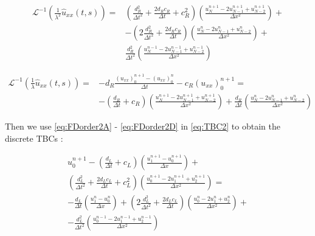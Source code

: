 \begin{equation}
     \label{eq:FDorder2C}
         \begin{aligned}
    \mathcal{L}^{-1} \left( \frac{1}{\lambda^2} \hat{u}_{xx}(t,s) \right) = & \left( \frac{d_R^2}{\Delta t^2} + \frac{2d_Rc_R}{\Delta t} + c_R^2  \right) \left(  \frac{u_{N}^{n+1} - 2u_{N-1}^{n+1} + u_{N-2}^{n+1}}{\Delta x^2} \right) + \\
    			& - \left( 2\frac{d_R^2}{\Delta t^2} + \frac{2d_Rc_R}{\Delta t}\right) \left(  \frac{u_N^{n} - 2u_{N-1}^n + u_{N-2}^{n}}{\Delta x^2} \right) + \\
    			& \frac{d_R^2}{\Delta t^2} \left(  \frac{u_N^{n-1} - 2u_{N-1}^{n-1} + u_{N-2}^{n-1}}{\Delta x^2} \right)
    \end{aligned}
 \end{equation}
     			
\begin{equation}
     \label{eq:FDorder2D}
         \begin{aligned}
    \mathcal{L}^{-1} \left( \frac{1}{\lambda} \hat{u}_{xx}(t,s) \right) = & -d_R \frac{ (u_{xx})_0^{n+1} - (u_{xx})_0^n}{\Delta t} - c_R (u_{xx})_0^{n+1} =\\
    			& -\left( \frac{d_R}{\Delta t} + c_R \right) \left( \frac{u_N^{n+1} -2 u_{N-1}^{n+1} + u_{N-2}^{n+1}}{\Delta x^2}\right) + \frac{d_R}{\Delta t}\left( \frac{u_{N}^{n} - 2u_{N-1}^{n} + u_{N-2}^n}{\Delta x^2}\right)
    \end{aligned}
\end{equation}

\indent Then we use \eqref{eq:FDorder2A} - \eqref{eq:FDorder2D} in \eqref{eq:TBC2} to obtain the discrete TBCs :

\begin{equation}
	\begin{aligned}
    u_0^{n+1} - \left( \frac{d_L}{\Delta t} + c_L \right) \left( \frac{u_1^{n+1} - u_0^{n+1}}{\Delta x}\right) + \\
     \left( \frac{d_L^2}{\Delta t^2} + \frac{2d_Lc_L}{\Delta t} + c_L^2  \right) \left(  \frac{u_0^{n+1} - 2u_1^{n+1} + u_2^{n+1}}{\Delta x^2} \right) = \\
     -\frac{d_L}{\Delta t}\left( \frac{u_1^{n} - u_0^{n}}{\Delta x}\right) +  \left( 2\frac{d_L^2}{\Delta t^2} + \frac{2d_Lc_L}{\Delta t}\right) \left(  \frac{u_0^{n} - 2u_1^n + u_2^{n}}{\Delta x^2} \right) + \\
     -  \frac{d_L^2}{\Delta t^2} \left(  \frac{u_0^{n-1} - 2u_1^{n-1} + u_2^{n-1}}{\Delta x^2} \right)
   \end{aligned}
\end{equation} 

